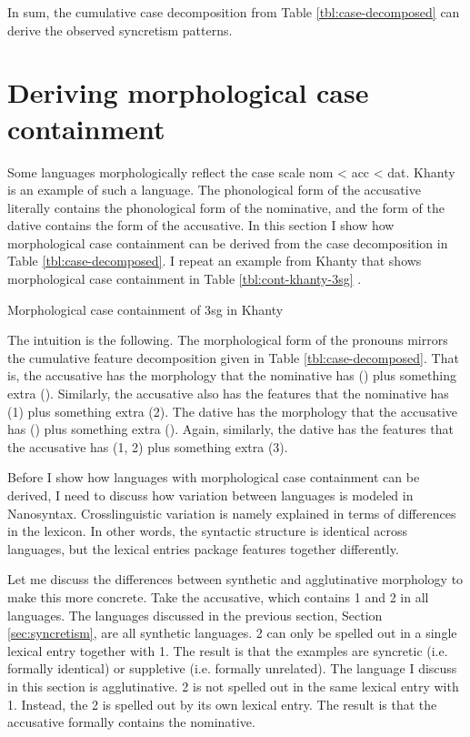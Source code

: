 In sum, the cumulative case decomposition from Table \ref{tbl:case-decomposed} can derive the observed syncretism patterns.

\section{Deriving morphological case containment}

Some languages morphologically reflect the case scale \ac{nom} < \ac{acc} < \ac{dat}. Khanty is an example of such a language. The phonological form of the accusative literally contains the phonological form of the nominative, and the form of the dative contains the form of the accusative. In this section I show how morphological case containment can be derived from the case decomposition in Table \ref{tbl:case-decomposed}. I repeat an example from Khanty that shows morphological case containment in Table \ref{tbl:cont-khanty-3sg} .

\begin{table}[ht]
  \center
  \caption {Morphological case containment of 3\ac{sg} in Khanty}
    
  \label{tbl:cont-khanty-3sg}
\end{table}

The intuition is the following. The morphological form of the pronouns mirrors the cumulative feature decomposition given in Table \ref{tbl:case-decomposed}. That is, the accusative has the morphology that the nominative has () plus something extra (). Similarly, the accusative also has the features that the nominative has (1) plus something extra (2). The dative has the morphology that the accusative has () plus something extra (). Again, similarly, the dative has the features that the accusative has (1, 2) plus something extra (3).

Before I show how languages with morphological case containment can be derived, I need to discuss how variation between languages is modeled in Nanosyntax. Crosslinguistic variation is namely explained in terms of differences in the lexicon. In other words, the syntactic structure is identical across languages, but the lexical entries package features together differently.

Let me discuss the differences between synthetic and agglutinative morphology to make this more concrete. Take the accusative, which contains 1 and 2 in all languages. The languages discussed in the previous section, Section \ref{sec:syncretism}, are all synthetic languages. 2 can only be spelled out in a single lexical entry together with 1. The result is that the examples are syncretic (i.e. formally identical) or suppletive (i.e. formally unrelated). The language I discuss in this section is agglutinative. 2 is not spelled out in the same lexical entry with 1. Instead, the 2 is spelled out by its own lexical entry. The result is that the accusative formally contains the nominative.

